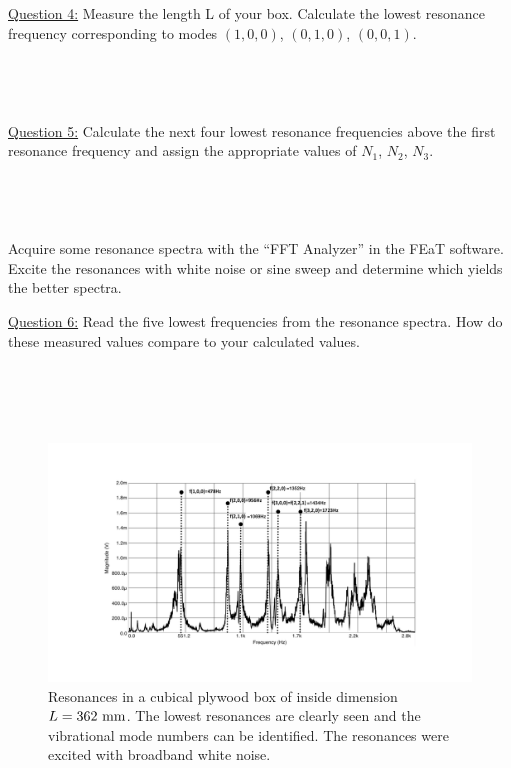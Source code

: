 \documentclass[11pt]{NSF}
\begin{document}
\underline{Question 4:} Measure the length L of your box. Calculate the lowest resonance frequency corresponding to modes $(1,0,0)$, $(0,1,0)$, $(0,0,1)$.
\\
\\
\\
\\
\\

\underline{Question 5:}  Calculate the next four lowest resonance frequencies above the first resonance frequency and assign the appropriate values of $N_1$, $N_2$, $N_3$.
\\
\\
\\
\\
\\

Acquire some resonance spectra with the “FFT Analyzer” in the FEaT software. Excite the resonances
with white noise or sine sweep and determine which yields the better spectra.

\underline{Question 6:} Read the five lowest frequencies from the resonance spectra. How do these measured values compare to your calculated values.
\\
\\
\\
\\
\\

%
\begin{figure}[hbtp]
\begin{center}
\includegraphics[width=.9\textwidth]{fig8_2}
\caption{Resonances in a cubical plywood box of inside dimension 
$L = 362~{\rm mm}$. 
The lowest resonances are clearly seen and the vibrational mode
numbers can be identified.
The resonances were excited with broadband white noise.}
\label{f:2}
\end{center}
\end{figure}
%
\end{document}
